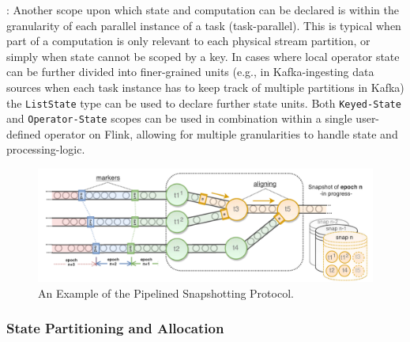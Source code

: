 : Another scope upon which state and computation can be declared is within the granularity of each parallel instance of a task (task-parallel). This is typical when part of a computation is only relevant to each physical stream partition, or simply when state cannot be scoped by a key. In cases where local operator state can be further divided into finer-grained units (e.g., in Kafka-ingesting data sources when each task instance has to keep track of multiple partitions in Kafka) the \texttt{ListState} type can be used to declare further state units. Both \texttt{Keyed-State} and \texttt{Operator-State} scopes can be used in combination within a single user-defined operator on Flink, allowing for multiple granularities to handle state and processing-logic.




\begin{figure}[t]
\centering
\includegraphics[width=\textwidth]{figures/snapshots-overview.pdf}
\caption{An Example of the Pipelined Snapshotting Protocol.} 
\label{fig:snapshots-overview}
\vspace{-4mm}
\end{figure}


\subsubsection{State Partitioning and Allocation}

